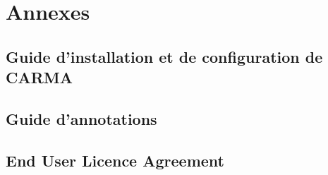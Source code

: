 \chapter{Annexes}
\section{Guide d'installation et de configuration de CARMA}
\label{ap:guideInstall}

%

\section{Guide d'annotations}
\label{ap:guidelines}
%


\section{End User Licence Agreement}
\label{ap:eula}
%


